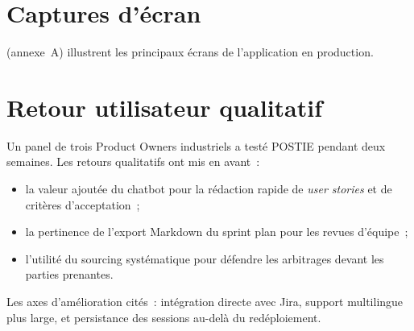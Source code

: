 \section{Captures d'écran}
 (annexe~A)
illustrent les principaux écrans de l'application en production.

\section{Retour utilisateur qualitatif}
Un panel de trois Product Owners industriels a testé POSTIE pendant
deux semaines. Les retours qualitatifs ont mis en avant~:
\begin{itemize}
  \item la valeur ajoutée du chatbot pour la rédaction rapide de
        \textit{user stories} et de critères d'acceptation~;
  \item la pertinence de l'export Markdown du sprint plan pour les
        revues d'équipe~;
  \item l'utilité du sourcing systématique pour défendre les
        arbitrages devant les parties prenantes.
\end{itemize}
Les axes d'amélioration cités~: intégration directe avec Jira,
support multilingue plus large, et persistance des sessions
au-delà du redéploiement.
